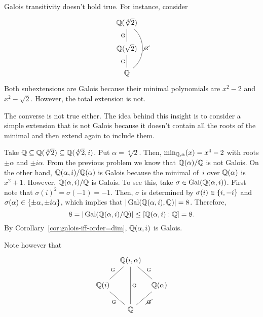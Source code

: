 \begin{solution}
    Galois transitivity doesn't hold true. For instance, consider
    $$
        \begin{tikzcd}
            {\Q(\sqrt[4]2)}
                \arrow[dd,bend left=50,"\cancel{\text{G}}" {pos=0.47},no head]\\
            \Q(\sqrt2)
                \arrow[u,"\text{G}",no head]\\
            \Q
                \arrow[u,"\text{G}", no head]
        \end{tikzcd}
    $$
    Both subextensions are Galois because their minimal polynomials are $x^2-2$ and $x^2-\sqrt2$. However, the total extension is not.
    
    The converse is not true either. The idea behind this insight is to consider a simple extension that is not Galois because it doesn't contain all the roots of the minimal and then extend again to include them.
    
    Take $\mathbb{Q}\subseteq\mathbb{Q}(\sqrt[4]2)\subseteq\mathbb{Q}(\sqrt[4]2,i)$. Put $\alpha=\sqrt[4]2$. Then, $\min_{\mathbb{Q},\alpha}(x)=x^4-2$ with roots $\pm\alpha$ and $\pm i\alpha$. From the previous problem we know that $\mathbb{Q}(\alpha)/\mathbb{Q}$ is not Galois. On the other hand, $\mathbb{Q}(\alpha,i)/\mathbb{Q}(\alpha)$ is Galois because the minimal of~$i$ over $\mathbb{Q}(\alpha)$ is~$x^2+1$. However, $\mathbb{Q}(\alpha,i)/\mathbb{Q}$ is Galois. To see this, take $\sigma\in\operatorname{Gal}(\mathbb{Q}(\alpha,i))$. First note that $\sigma(i)^2=\sigma(-1)=-1$. Then, $\sigma$ is determined by $\sigma(i)\in\{i,-i\}$ and $\sigma(\alpha)\in\{\pm\alpha,\pm i\alpha\}$, which implies that $|\operatorname{Gal}(\mathbb{Q}(\alpha,i),\mathbb{Q})|=8$. Therefore,
    $$
        8 = |\operatorname{Gal}(\mathbb{Q}(\alpha,i)/\mathbb{Q})|\le[\mathbb{Q}(\alpha,i):\mathbb{Q}]=8.
    $$
    By Corollary~\ref{cor:galois-iff-order=dim}, $\mathbb{Q}(\alpha,i)$ is Galois.

    Note however that
    $$
        \begin{tikzcd}[column sep=tiny]
                &{\Q(i,\alpha)}
                    \arrow[dd,"\text{G}", no head]\\
            \Q(i)
                    \arrow[ru,"\text{G}",no head]
                &&\Q(\alpha)
                    \arrow[lu,"\text{G}"',no head]\\
                &\Q
                    \arrow[lu,"\text{G}" {pos=0.47},no head]
                    \arrow[ru,"\cancel{\text{G}}"' {pos=0.54}, no head]
        \end{tikzcd}
    $$
\end{solution}

